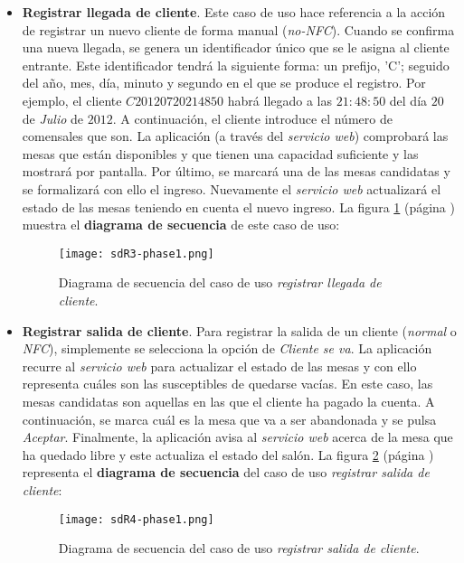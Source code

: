 \begin{itemize}
\item \textbf{Registrar llegada de cliente}. Este caso de uso hace referencia
a la acción de registrar un nuevo cliente de forma manual
(\emph{no-\acs{NFC}}). Cuando se confirma una nueva llegada, se
genera un identificador único que se le asigna al cliente entrante.
Este identificador tendrá la siguiente forma: un prefijo, 'C'; seguido del
año, mes, día, minuto y segundo en el que se produce el registro. Por ejemplo,
el cliente $C20120720214850$ habrá llegado a las $21:48:50$ del día $20$ de
\emph{Julio} de $2012$. A continuación, el cliente introduce el número de
comensales que son. La aplicación (a través del \emph{servicio web})
comprobará las mesas que están disponibles y que tienen una capacidad
suficiente y las mostrará por pantalla. Por último, se marcará una de las
mesas candidatas y se formalizará con ello el ingreso. Nuevamente el
\emph{servicio web} actualizará el estado de las mesas teniendo en cuenta el
nuevo ingreso. La figura \ref{fig:sdR3-phase1} (página
\pageref{fig:sdR3-phase1}) muestra el \textbf{diagrama de secuencia} de este
caso de uso:

  \begin{figure}[!h]
    \begin{center}
      \texttt{[image: sdR3-phase1.png]}
      \caption{Diagrama de secuencia del caso de uso \emph{registrar llegada
      de cliente}.}
      \label{fig:sdR3-phase1}
    \end{center}
  \end{figure}

\item \textbf{Registrar salida de cliente}. Para registrar la salida de un
cliente (\emph{normal} o \emph{\acs{NFC}}), simplemente se selecciona la
opción de \emph{Cliente se va}. La aplicación recurre al \emph{servicio web}
para actualizar el estado de las mesas y con ello representa cuáles son las
susceptibles de quedarse vacías. En este caso, las mesas candidatas son
aquellas en las que el cliente ha pagado la cuenta. A continuación, se marca
cuál es la mesa que va a ser abandonada y se pulsa \emph{Aceptar}. Finalmente,
la aplicación avisa al \emph{servicio web} acerca de la mesa que ha quedado
libre y este actualiza el estado del salón. La figura \ref{fig:sdR4-phase1}
(página \pageref{fig:sdR4-phase1}) representa el \textbf{diagrama de secuencia}
del caso de uso \emph{registrar salida de cliente}:

  \begin{figure}[!h]
    \begin{center}
      \texttt{[image: sdR4-phase1.png]}
      \caption{Diagrama de secuencia del caso de uso \emph{registrar salida
      de cliente}.}
      \label{fig:sdR4-phase1}
    \end{center}
  \end{figure}
\end{itemize}

